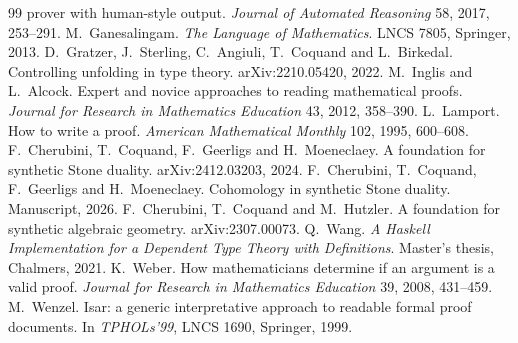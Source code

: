 \documentclass[11pt]{article}
\begin{document}
\begin{thebibliography}{99}
  prover with human-style output. \emph{Journal of Automated Reasoning}
  58, 2017, 253--291.
 M.~Ganesalingam. \emph{The Language of Mathematics}. LNCS
  7805, Springer, 2013.
 D.~Gratzer, J.~Sterling, C.~Angiuli, T.~Coquand and
  L.~Birkedal. Controlling unfolding in type theory. arXiv:2210.05420,
  2022.
 M.~Inglis and L.~Alcock. Expert and novice approaches to
  reading mathematical proofs. \emph{Journal for Research in Mathematics
  Education} 43, 2012, 358--390.
 L.~Lamport. How to write a proof. \emph{American
  Mathematical Monthly} 102, 1995, 600--608.
 F.~Cherubini, T.~Coquand, F.~Geerligs and H.~Moeneclaey.
  A foundation for synthetic Stone duality. arXiv:2412.03203, 2024.
 F.~Cherubini, T.~Coquand, F.~Geerligs and H.~Moeneclaey.
  Cohomology in synthetic Stone duality. Manuscript, 2026.
 F.~Cherubini, T.~Coquand and M.~Hutzler. A foundation for
  synthetic algebraic geometry. arXiv:2307.00073.
 Q.~Wang. \emph{A Haskell Implementation for a Dependent
  Type Theory with Definitions}. Master's thesis, Chalmers, 2021.
 K.~Weber. How mathematicians determine if an argument is
  a valid proof. \emph{Journal for Research in Mathematics Education} 39,
  2008, 431--459.
 M.~Wenzel. Isar: a generic interpretative approach to
  readable formal proof documents. In \emph{TPHOLs'99}, LNCS 1690,
  Springer, 1999.
\end{thebibliography}
\end{document}
